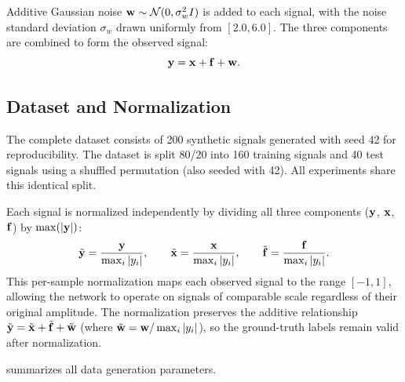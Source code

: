 Additive Gaussian noise $\mathbf{w} \sim \mathcal{N}(0, \sigma_w^2 I)$ is added to each signal, with the noise standard deviation $\sigma_w$ drawn uniformly from $[2.0, 6.0]$. The three components are combined to form the observed signal:
\begin{equation}
    \mathbf{y} = \mathbf{x} + \mathbf{f} + \mathbf{w}.
\end{equation}


\subsection{Dataset and Normalization}
\label{sec:exp_dataset}

The complete dataset consists of 200 synthetic signals generated with seed 42 for reproducibility. The dataset is split 80/20 into 160 training signals and 40 test signals using a shuffled permutation (also seeded with 42). All experiments share this identical split.

Each signal is normalized independently by dividing all three components ($\mathbf{y}$, $\mathbf{x}$, $\mathbf{f}$) by $\max(|\mathbf{y}|)$:
\begin{equation}
    \tilde{\mathbf{y}} = \frac{\mathbf{y}}{\max_i |y_i|}, \qquad
    \tilde{\mathbf{x}} = \frac{\mathbf{x}}{\max_i |y_i|}, \qquad
    \tilde{\mathbf{f}} = \frac{\mathbf{f}}{\max_i |y_i|}.
    \label{eq:normalization}
\end{equation}
This per-sample normalization maps each observed signal to the range $[-1, 1]$, allowing the network to operate on signals of comparable scale regardless of their original amplitude. The normalization preserves the additive relationship $\tilde{\mathbf{y}} = \tilde{\mathbf{x}} + \tilde{\mathbf{f}} + \tilde{\mathbf{w}}$ (where $\tilde{\mathbf{w}} = \mathbf{w} / \max_i |y_i|$), so the ground-truth labels remain valid after normalization.

 summarizes all data generation parameters.

